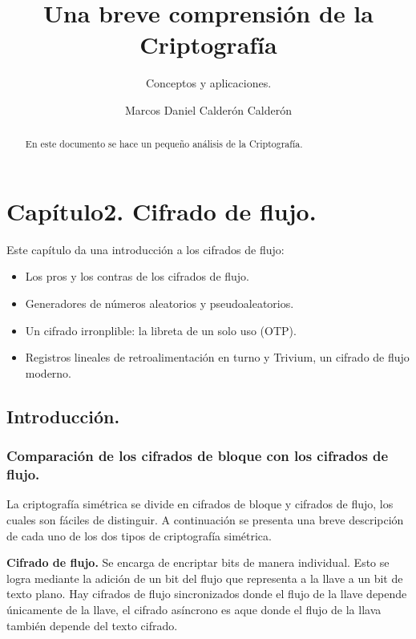\documentclass{llncs}
\theoremstyle{plane}
\begin{document}
\title{Una breve comprensión de la Criptografía}



\subtitle{Conceptos y aplicaciones.}


\author{Marcos Daniel Calderón Calderón}





\maketitle

\begin{abstract}
En este documento se hace un pequeño análisis de la Criptografía.
\end{abstract}
\section{Capítulo2. Cifrado de flujo.}
Este capítulo da una introducción a los cifrados de flujo:
\begin{itemize}
\item Los pros y los contras de los cifrados de flujo.
\item Generadores de números aleatorios y pseudoaleatorios.
\item Un cifrado irronplible: la libreta de un solo uso (OTP).
\item Registros lineales de retroalimentación en turno y Trivium, un cifrado de flujo moderno.
\end{itemize}
\subsection{Introducción.}

\subsubsection{Comparación de los cifrados de bloque con los cifrados de flujo.}

La criptografía simétrica se divide en cifrados de bloque y cifrados de flujo, los cuales son fáciles de distinguir. A continuación se presenta una breve descripción de cada uno de los dos tipos de criptografía simétrica.

\textbf{Cifrado de flujo.}  Se encarga de encriptar bits de manera individual. Esto se logra mediante la adición de un bit del flujo que representa a la llave  a un bit de texto plano. Hay cifrados de flujo sincronizados donde el flujo de la llave depende únicamente de la llave, el cifrado asíncrono es aque donde el flujo de la llava también depende del texto cifrado. 
\end{document}

